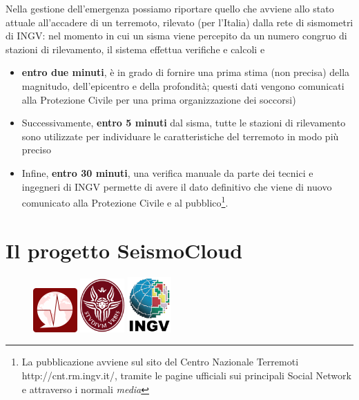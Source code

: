 \documentclass[a4paper,10pt]{memoir}
\begin{document}
Nella gestione dell'emergenza possiamo riportare quello che avviene allo stato attuale all'accadere di un terremoto, rilevato (per l'Italia) dalla rete di sismometri di INGV: nel momento in cui un sisma viene percepito da un numero congruo di stazioni di rilevamento, il sistema effettua verifiche e calcoli e
\begin{itemize}
\item \textbf{entro due minuti}, è in grado di fornire una prima stima (non precisa) della magnitudo, dell'epicentro e della profondità; questi dati vengono comunicati alla Protezione Civile per una prima organizzazione dei soccorsi)
\item Successivamente, \textbf{entro 5 minuti} dal sisma, tutte le stazioni di rilevamento sono utilizzate per individuare le caratteristiche del terremoto in modo più preciso
\item Infine, \textbf{entro 30 minuti}, una verifica manuale da parte dei tecnici e ingegneri di INGV permette di avere il dato definitivo che viene di nuovo comunicato alla Protezione Civile e al pubblico\footnote{La pubblicazione avviene sul sito del Centro Nazionale Terremoti http://cnt.rm.ingv.it/, tramite le pagine ufficiali sui principali Social Network e attraverso i normali \textit{media}}.
\end{itemize}

\pagebreak

\section{Il progetto SeismoCloud}

\begin{figure}
\centering
\label{fig:seismocloudlogos}
\includegraphics[width=0.15\textwidth]{app/seismocloud}
\includegraphics[width=0.15\textwidth]{logo-sapienza-mini}
\includegraphics[width=0.15\textwidth]{app/ingv}
\end{figure}
\end{document}
